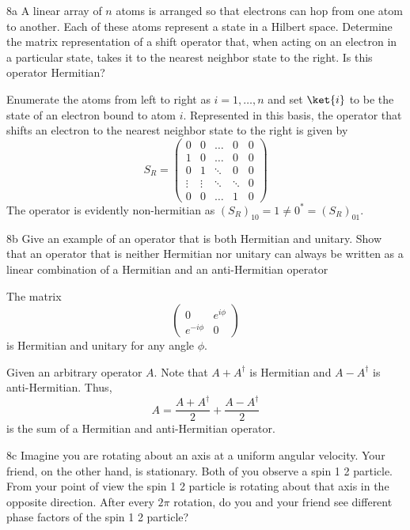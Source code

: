 \documentclass[12pt]{article}
\begin{document}
\newpage 
\begin{exc}{8a}
    A linear array of $n$ atoms is arranged so that electrons can hop from
one atom to another. Each of these atoms represent a state in a Hilbert
space. Determine the matrix representation of a shift operator that,
when acting on an electron in a particular state, takes it to the nearest
neighbor state to the right. Is this operator Hermitian?
\end{exc}
\begin{ans}
    Enumerate the atoms from left to right as $i = 1, \ldots, n$ and set $\ket{i}$ to be the state of an electron bound to atom $i$. Represented in this basis, the operator that shifts an electron to the nearest neighbor state to the right is given by 
    \[S_R = \begin{pmatrix}
        0 & 0 & \ldots & 0 & 0 \\ 
        1 & 0 & \ldots & 0 & 0 \\ 
        0 & 1 & \ddots & 0 & 0 \\ 
        \vdots & \vdots & \ddots & \ddots & 0 \\ 
        0 & 0 & \ldots & 1 & 0
    \end{pmatrix}\]
    The operator is evidently non-hermitian as $(S_R)_{10} = 1 \neq 0^* = (S_R)_{01}$.
\end{ans}

\begin{exc}{8b}
     Give an example of an operator that is both Hermitian and unitary.
Show that an operator that is neither Hermitian nor unitary can always
be written as a linear combination of a Hermitian and an anti-Hermitian
operator
\end{exc}
\begin{ans}
 The matrix 
 \[\begin{pmatrix}
    0 & e^{i\phi} \\ e^{-i\phi} & 0
 \end{pmatrix}\]
 is Hermitian and unitary for any angle $\phi$. 

 Given an arbitrary operator $A$. Note that $A + A^\dagger$ is Hermitian and $A - A^\dagger$ is anti-Hermitian. Thus, 
 \[A = \frac{A + A^\dagger}2 + \frac{A - A^\dagger}{2}\]
 is the sum of a Hermitian and anti-Hermitian operator.
\end{ans}

\begin{exc}{8c}
    Imagine you are rotating about an axis at a uniform angular velocity.
Your friend, on the other hand, is stationary. Both of you observe a
spin 1
2 particle. From your point of view the spin 1
2 particle is rotating
about that axis in the opposite direction. After every $2\pi$ rotation, do
you and your friend see different phase factors of the spin 1
2 particle?
\end{exc}
\begin{ans}

\end{ans}
\end{document}
